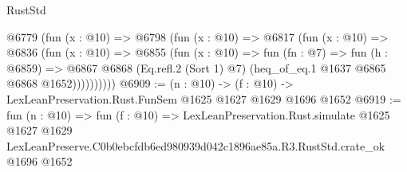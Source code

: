 \begin{lexlean}{RustStd}
\begin{coremodule}
          @6779
            (fun (x : @10) =>
            @6798
              (fun (x : @10) =>
              @6817
                (fun (x : @10) =>
                @6836
                  (fun (x : @10) =>
                  @6855
                    (fun (x : @10) =>
                    fun (fn : @7) =>
                    fun (h : @6859) =>
                    @6867
                      @6868
                      (Eq.refl.{2} (Sort 1) @7)
                      (heq_of_eq.{1} @1637 @6865 @6868 @1652))))))))))
@6909 := (n : @10) -> (f : @10) -> LexLeanPreservation.Rust.FunSem @1625 @1627 @1629 @1696 @1652
@6919 := fun (n : @10) =>
  fun (f : @10) =>
  LexLeanPreservation.Rust.simulate
    @1625
    @1627
    @1629
    LexLeanPreserve.C0b0ebcfdb6ed980939d042c1896ae85a.R3.RustStd.crate_ok
    @1696
    @1652
\end{coremodule}
\end{lexlean}
